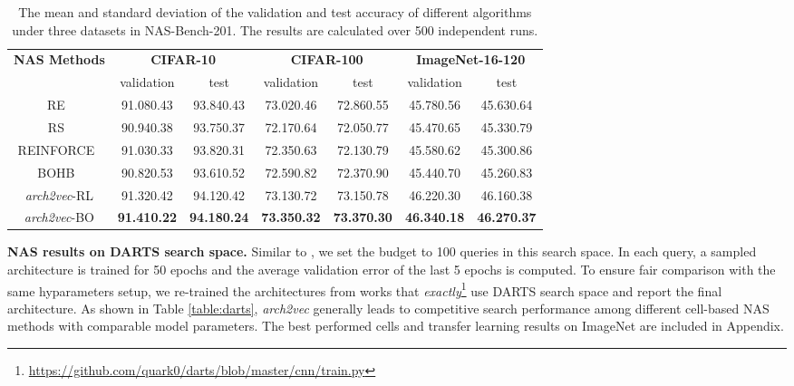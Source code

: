 \begin{table}[t]
\begin{adjustbox}{width=\columnwidth,center}
\scriptsize{
\begin{tabular}{|c|c|c|c|c|c|c|}
\hline
\multirow{2}{*}{\textbf{NAS Methods}}  & \multicolumn{2}{c|}{\textbf{CIFAR-10}}                     & \multicolumn{2}{c|}{\textbf{CIFAR-100}}                  & \multicolumn{2}{c|}{\textbf{ImageNet-16-120}}              \\ \cline{2-7} & validation              & test                    & validation             & test                   & validation              & test                    \\ \hline
RE~\cite{real2019regularized}      & 91.080.43          & 93.840.43          & 73.020.46         & 72.860.55         & 45.780.56          & 45.630.64          \\
RS~\cite{bergstra12randsearch}  & 90.940.38          & 93.750.37          & 72.170.64         & 72.050.77         & 45.470.65          & 45.330.79          \\
REINFORCE~\cite{williams92rl}     & 91.030.33          & 93.820.31          & 72.350.63         & 72.130.79         & 45.580.62          & 45.300.86          \\
BOHB~\cite{falkner-icml-18}      & 90.820.53          & 93.610.52          & 72.590.82         & 72.370.90         & 45.440.70          & 45.260.83          \\ \hline
\textit{arch2vec}-RL    & 91.320.42          & 94.120.42          & 73.130.72         & 73.150.78         & 46.220.30 & 46.160.38          \\
\textit{arch2vec}-BO    & \textbf{91.410.22} & \textbf{94.180.24} & \textbf{73.350.32} & \textbf{73.370.30} & \textbf{46.340.18}          & \textbf{46.270.37} \\ \hline
\end{tabular}
}
\end{adjustbox}
\vspace{1mm}
\caption{The mean and standard deviation of the validation and test accuracy of different algorithms under three datasets in NAS-Bench-201. The results are calculated over 500 independent runs.} \vspace{-1mm}
\label{table:NasBench201}
\end{table}

\vspace{1mm}
\textbf{NAS results on DARTS search space.}
Similar to \cite{white2019bananas}, we set the budget to 100 queries in this search space. In each query, a sampled architecture is trained for 50 epochs and the average validation error of the last 5 epochs is computed. To ensure fair comparison with the same hyparameters setup, we re-trained the architectures from works that \emph{exactly}\footnote{\url{https://github.com/quark0/darts/blob/master/cnn/train.py}} use DARTS search space and report the final architecture. 
As shown in Table \ref{table:darts}, \textit{arch2vec} generally leads to competitive search performance among different cell-based NAS methods with comparable model parameters. The best performed cells and transfer learning results on ImageNet \cite{imagenet_cvpr09} are included in Appendix. 


